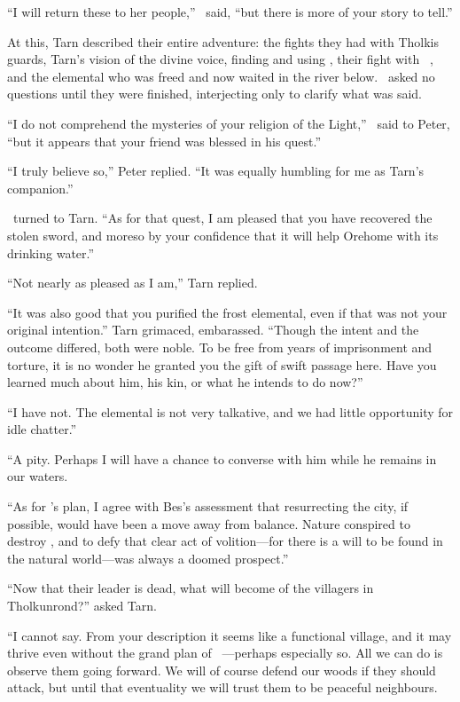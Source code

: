 ``I will return these to her people,'' \arilor\ said, ``but there is more of your story to tell.''

At this, Tarn described their entire adventure: the fights they had with Tholkis guards, Tarn's vision of the divine voice, finding and using \kildir, their fight with \mothzam\ \driktur, and the elemental who was freed and now waited in the river below.  \arilor\ asked no questions until they were finished, interjecting only to clarify what was said.

``I do not comprehend the mysteries of your religion of the Light,'' \arilor\ said to Peter, ``but it appears that your friend was blessed in his quest.''

``I truly believe so,'' Peter replied.  ``It was equally humbling for me as Tarn's companion.''

\arilor\ turned to Tarn.  ``As for that quest, I am pleased that you have recovered the stolen sword, and moreso by your confidence that it will help Orehome with its drinking water.''

``Not nearly as pleased as I am,'' Tarn replied.

``It was also good that you purified the frost elemental, even if that was not your original intention.''  Tarn grimaced, embarassed.  ``Though the intent and the outcome differed, both were noble.  To be free from years of imprisonment and torture, it is no wonder he granted you the gift of swift passage here.  Have you learned much about him, his kin, or what he intends to do now?''

``I have not.  The elemental is not very talkative, and we had little opportunity for idle chatter.''

``A pity.  Perhaps I will have a chance to converse with him while he remains in our waters.

``As for \mothzam's plan, I agree with Bes's assessment that resurrecting the city, if possible, would have been a move away from balance.  Nature conspired to destroy \atmudarant, and to defy that clear act of volition---for there is a will to be found in the natural world---was always a doomed prospect.''

``Now that their leader is dead, what will become of the villagers in Tholkunrond?'' asked Tarn.

``I cannot say.  From your description it seems like a functional village, and it may thrive even without the grand plan of \mothzam\ \driktur---perhaps especially so.  All we can do is observe them going forward.  We will of course defend our woods if they should attack, but until that eventuality we will trust them to be peaceful neighbours.

